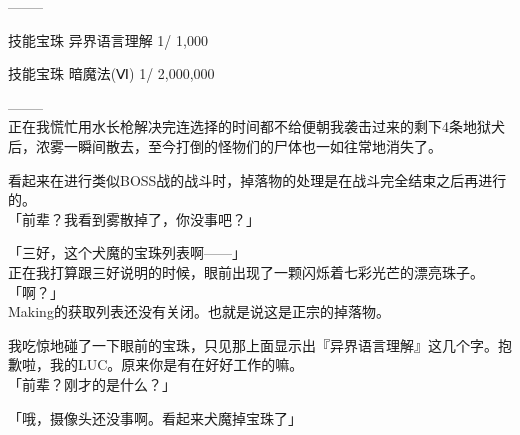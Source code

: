   --------

  技能宝珠  异界语言理解  1/     1,000

  技能宝珠    暗魔法(Ⅵ)  1/ 2,000,000

  --------\\

正在我慌忙用水长枪解决完连选择的时间都不给便朝我袭击过来的剩下4条地狱犬后，浓雾一瞬间散去，至今打倒的怪物们的尸体也一如往常地消失了。

看起来在进行类似BOSS战的战斗时，掉落物的处理是在战斗完全结束之后再进行的。\\

「前辈？我看到雾散掉了，你没事吧？」

「三好，这个犬魔的宝珠列表啊——」\\

正在我打算跟三好说明的时候，眼前出现了一颗闪烁着七彩光芒的漂亮珠子。\\

「啊？」\\

Making的获取列表还没有关闭。也就是说这是正宗的掉落物。

我吃惊地碰了一下眼前的宝珠，只见那上面显示出『异界语言理解』这几个字。抱歉啦，我的LUC。原来你是有在好好工作的嘛。\\

「前辈？刚才的是什么？」

「哦，摄像头还没事啊。看起来犬魔掉宝珠了」

